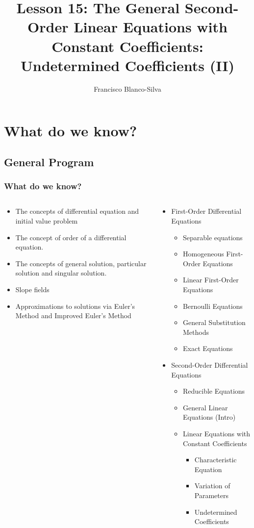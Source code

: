 \documentclass[9pt,xcolor=x11names,compress]{beamer}
\author[Francisco Blanco-Silva]{Francisco Blanco-Silva}
\institute[USC]{University of South Carolina}
\date{
\pgfdeclarelindenmayersystem{Gosper curve}{
	\rule{XF -> XF+YF++YF-XF--XFXF-YF+}
	\rule{YF -> -XF+YFYF++YF+XF--XF-YF}
}
\begin{tikzpicture}[color=DeepSkyBlue4]
\draw [l-system={Gosper curve, axiom=XF, order=5, step=0.6pt, angle=60}]
lindenmayer system; 
\end{tikzpicture}
}
\title{Lesson 15: The General Second-Order Linear Equations with Constant Coefficients: Undetermined Coefficients (II)}
\begin{document}
\frame{\titlepage}

\section{What do we know?}
\subsection{General Program}
\begin{frame}\frametitle{What do we know?}
\begin{columns}[T]
\begin{column}{0.45\linewidth}
\begin{itemize}
\item The concepts of \alert{differential equation} and \alert{initial value problem}
\item The concept of \alert{order} of a differential equation.
\item The concepts of \alert{general solution}, \alert{particular solution} and \alert{singular solution}.
\item \alert{Slope fields}
\item Approximations to solutions via \alert{Euler's Method} and \alert{Improved Euler's Method}
\end{itemize} 
\end{column}
\begin{column}{0.55\linewidth}
\begin{itemize}
\item First-Order Differential Equations
\begin{itemize}
\item Separable equations 
\item Homogeneous First-Order Equations 
\item Linear First-Order Equations 
\item Bernoulli Equations 
\item General Substitution Methods
\item Exact Equations 
\end{itemize}
\item Second-Order Differential Equations
\begin{itemize}
	\item Reducible Equations
	\item General Linear Equations (Intro)
	\item Linear Equations with Constant Coefficients
	\begin{itemize}
		\item Characteristic Equation
		\item Variation of Parameters
		\item Undetermined Coefficients
	\end{itemize}
\end{itemize}
\end{itemize}
\end{column}
\end{columns}
\end{frame}
\end{document}
